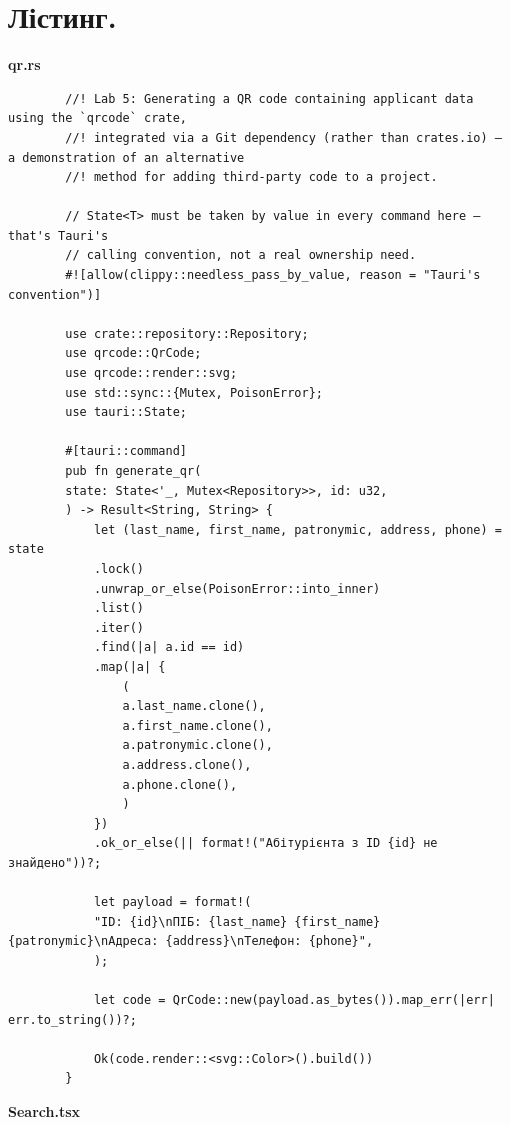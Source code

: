 \documentclass[14pt, a4paper]{extreport}
\begin{document}
	\pagebreak

	\section*{Лістинг.}

	\textbf{qr.rs}

	\begin{verbatim}
		//! Lab 5: Generating a QR code containing applicant data using the `qrcode` crate,
		//! integrated via a Git dependency (rather than crates.io) — a demonstration of an alternative
		//! method for adding third-party code to a project.
		
		// State<T> must be taken by value in every command here — that's Tauri's
		// calling convention, not a real ownership need.
		#![allow(clippy::needless_pass_by_value, reason = "Tauri's convention")]
		
		use crate::repository::Repository;
		use qrcode::QrCode;
		use qrcode::render::svg;
		use std::sync::{Mutex, PoisonError};
		use tauri::State;
		
		#[tauri::command]
		pub fn generate_qr(
		state: State<'_, Mutex<Repository>>, id: u32,
		) -> Result<String, String> {
			let (last_name, first_name, patronymic, address, phone) = state
			.lock()
			.unwrap_or_else(PoisonError::into_inner)
			.list()
			.iter()
			.find(|a| a.id == id)
			.map(|a| {
				(
				a.last_name.clone(),
				a.first_name.clone(),
				a.patronymic.clone(),
				a.address.clone(),
				a.phone.clone(),
				)
			})
			.ok_or_else(|| format!("Абітурієнта з ID {id} не знайдено"))?;
			
			let payload = format!(
			"ID: {id}\nПІБ: {last_name} {first_name} {patronymic}\nАдреса: {address}\nТелефон: {phone}",
			);
			
			let code = QrCode::new(payload.as_bytes()).map_err(|err| err.to_string())?;
			
			Ok(code.render::<svg::Color>().build())
		}
	\end{verbatim}
	
	\textbf{Search.tsx}
	
\end{document}
